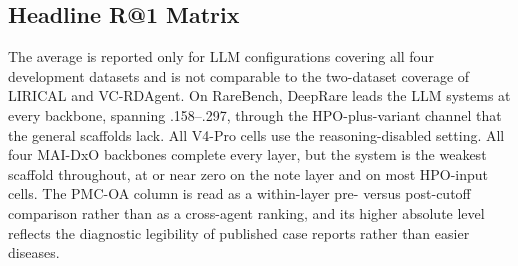 \subsection{Headline R@1 Matrix}
\label{sec-6-1}
The average is reported only for LLM configurations covering all four development datasets and is not comparable to the two-dataset coverage of LIRICAL and VC-RDAgent. On RareBench, DeepRare leads the LLM systems at every backbone, spanning .158--.297, through the HPO-plus-variant channel that the general scaffolds lack. All V4-Pro cells use the reasoning-disabled setting. All four MAI-DxO backbones complete every layer, but the system is the weakest scaffold throughout, at or near zero on the note layer and on most HPO-input cells. The PMC-OA column is read as a within-layer pre- versus post-cutoff comparison rather than as a cross-agent ranking, and its higher absolute level reflects the diagnostic legibility of published case reports rather than easier diseases.

